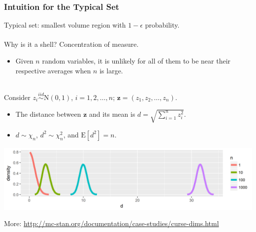\documentclass[xcolor=dvipsnames]{beamer}
\begin{document}
\begin{frame}
\frametitle{Intuition for the Typical Set}
Typical set: smallest volume region with $1 - \epsilon$ probability.\\~\\

Why is it a shell? Concentration of measure.
\begin{itemize}
\item Given $n$ random variables, it is unlikely for all of them to be near their respective averages when $n$ is large.\\~\\
\end{itemize}

Consider $z_i \stackrel{iid}{\sim} \mathrm{N}(0, 1)$, $i = 1,2,\dots, n$; $\bm{z} = (z_1,z_2,\dots,z_n)$.
\begin{itemize}
\item The distance between $\bm{z}$ and its mean is $d = \sqrt{\sum_{i=1}^nz_i^2}$.
\item $d\sim\chi_n$, $d^2\sim\chi^2_n$, and $\mathrm{E}[d^2] = n$.
\end{itemize}
\begin{center}
\includegraphics[width = \textwidth]{code/chiplot.png}
\end{center}
More: {\scriptsize \url{http://mc-stan.org/documentation/case-studies/curse-dims.html}}
\end{frame}
\end{document}

